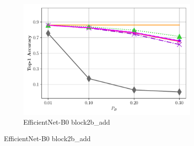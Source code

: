 \documentclass[aspectratio=169]{beamer}
\begin{document}
\begin{frame}
\begin{figure}[H]
\begin{subfigure}{.275\textwidth}
			\includegraphics[width=\textwidth]{lp_vcip_rpp_8_top1_efficientnetb0.pdf}
			\vspace*{-8mm} \caption{EfficientNet-B0 block2b\_add}
		\end{subfigure}
		

\end{figure}
\end{frame}
\end{document}
